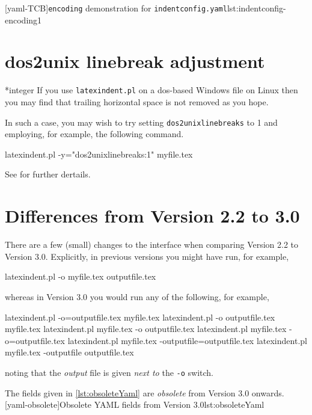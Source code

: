 	 [yaml-TCB]{\texttt{encoding} demonstration for \texttt{indentconfig.yaml}}{lst:indentconfig-encoding1}

	\section{dos2unix linebreak adjustment}

	*{integer}
		If you use \texttt{latexindent.pl} on a dos-based Windows file on Linux
		 then you may find that trailing horizontal
		space is not removed as you hope.

		In such a case, you may wish to try setting \texttt{dos2unixlinebreaks} to 1 and
		employing, for example, the following command.

		\begin{commandshell}
latexindent.pl -y="dos2unixlinebreaks:1" myfile.tex
\end{commandshell}

		See \cite{bersbersbers} for further dertails.

	\section{Differences from Version 2.2 to 3.0}\label{app:differences}
	 There are a few (small) changes to the interface when comparing Version 2.2 to Version
	 3.0. Explicitly, in previous versions you might have run, for example,
	 \begin{commandshell}
latexindent.pl -o myfile.tex outputfile.tex
\end{commandshell}
	 whereas in Version 3.0 you would run any of the following, for example,
	 \begin{commandshell}
latexindent.pl -o=outputfile.tex myfile.tex
latexindent.pl -o outputfile.tex myfile.tex
latexindent.pl myfile.tex -o outputfile.tex 
latexindent.pl myfile.tex -o=outputfile.tex 
latexindent.pl myfile.tex -outputfile=outputfile.tex 
latexindent.pl myfile.tex -outputfile outputfile.tex 
\end{commandshell}
	 noting that the \emph{output} file is given \emph{next to} the \texttt{-o} switch.

	 The fields given in \cref{lst:obsoleteYaml} are \emph{obsolete} from Version 3.0 onwards.
	 [yaml-obsolete]{Obsolete YAML fields from Version 3.0}{lst:obsoleteYaml}

